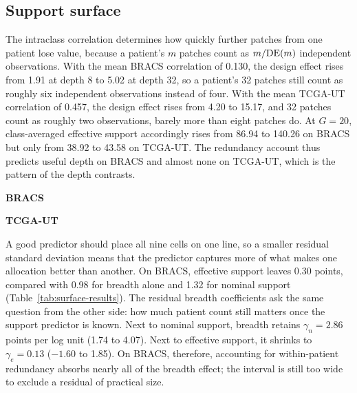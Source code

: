 \subsection{Support surface}
The intraclass correlation determines how quickly further patches from one patient lose value, because a patient's $m$ patches count as $m/\mathrm{DE}(m)$ independent observations. With the mean BRACS correlation of 0.130, the design effect rises from 1.91 at depth 8 to 5.02 at depth 32, so a patient's 32 patches still count as roughly six independent observations instead of four. With the mean TCGA-UT correlation of 0.457, the design effect rises from 4.20 to 15.17, and 32 patches count as roughly two observations, barely more than eight patches do. At $G=20$, class-averaged effective support accordingly rises from 86.94 to 140.26 on BRACS but only from 38.92 to 43.58 on TCGA-UT. The redundancy account thus predicts useful depth on BRACS and almost none on TCGA-UT, which is the pattern of the depth contrasts.

\begin{table}[htbp]
\centering\small
\textbf{BRACS}\par\smallskip

\par\medskip
\textbf{TCGA-UT}\par\smallskip

\caption{Effective support places the nine BRACS cells closest to a single line, whereas on TCGA-UT patient count alone fits at least as well; nominal support fits worst in both cohorts. Each row fits $A=\alpha+\beta\log(\cdot)$ over the nine pooled cell scores. Slopes are percentage points per natural log unit with paired 95\% intervals; residual standard deviations are percentage points with seven residual degrees of freedom and describe in-sample fit, not predictive validation.}
\label{tab:surface-results}
\end{table}

\noindent A good predictor should place all nine cells on one line, so a smaller residual standard deviation means that the predictor captures more of what makes one allocation better than another. On BRACS, effective support leaves 0.30 points, compared with 0.98 for breadth alone and 1.32 for nominal support (Table~\ref{tab:surface-results}). The residual breadth coefficients ask the same question from the other side: how much patient count still matters once the support predictor is known. Next to nominal support, breadth retains $\gamma_n=2.86$ points per log unit (1.74 to 4.07). Next to effective support, it shrinks to $\gamma_e=0.13$ ($-1.60$ to 1.85). On BRACS, therefore, accounting for within-patient redundancy absorbs nearly all of the breadth effect; the interval is still too wide to exclude a residual of practical size.

